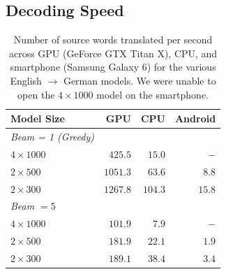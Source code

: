 \documentclass[11pt,letterpaper]{article}
\begin{document}

\subsection{Decoding Speed}
\begin{table}[t] \label{speed}
\centering
\small
\begin{tabular}{l  r  r  r  }
\toprule
Model Size  & GPU & CPU & Android \\
\midrule
\textit{Beam = 1 (Greedy)}\\
\midrule 
$4 \times 1000$ &$425.5$& $15.0$& $-$   \\
$2 \times 500$ &$1051.3$& $63.6$&$8.8$   \\
$2 \times 300$& $1267.8$& $104.3$&$15.8$   \\
\midrule
\textit{Beam $=5$} \\
\midrule
$4 \times 1000$ &$101.9$ & $7.9$ & $-$  \\
$2 \times 500$ & $181.9$&  $22.1$ & $1.9$ \\
$2 \times 300$ & $189.1$&  $38.4$ &$3.4$ \\
\bottomrule
\end{tabular}
\caption{Number of source words translated per second across GPU (GeForce GTX Titan X), 
CPU, and smartphone (Samsung Galaxy 6) for the various English $\rightarrow$ German models. 
We were unable to open the $4 \times 1000$ model on the smartphone.}
\end{table}
\end{document}
